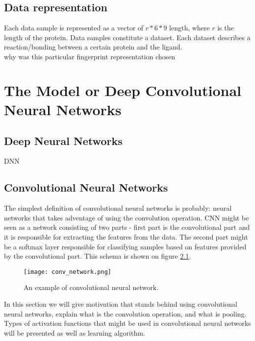 \documentclass[a4paper,10pt]{report}
\begin{document}
    \section{Data representation} %
    Each data sample is represented as a vector of $r*6*9$ length, where $r$ is the length of the protein. Data samples constitute a dataset. Each dataset describes a reaction/bonding between a certain protein and the ligand.\\
    
    why was this particular fingerprint representation chosen %
    
    
  \chapter{The Model or Deep Convolutional Neural Networks}
    
    \section{Deep Neural Networks}
      DNN

    \section{Convolutional Neural Networks}
      The simplest definition of convolutional neural networks is probably: neural networks that takes adventage of using the convolution operation. CNN might be seen as a network consisting of two parts - first part is the convolutional part and it is responsible for extracting the features from the data. The second part might be a softmax layer responsible for classifying samples based on features provided by the convolutional part. This schema is shown on figure \ref{fig:con_network}.\\
      
     \begin{figure}[h!]
	  \centering
	  \texttt{[image: conv\_network.png]}
	  \caption{An example of convolutional neural network.}
	  \label{fig:con_network}
	\end{figure} 
      
      In this section we will give motivation that stands behind using convolutional neural networks, explain what is the convolution operation, and what is pooling. Types of activation functions that might be used in convolutional neural networks
      will be presented as well as learning algorithm.\\
      
\end{document}
